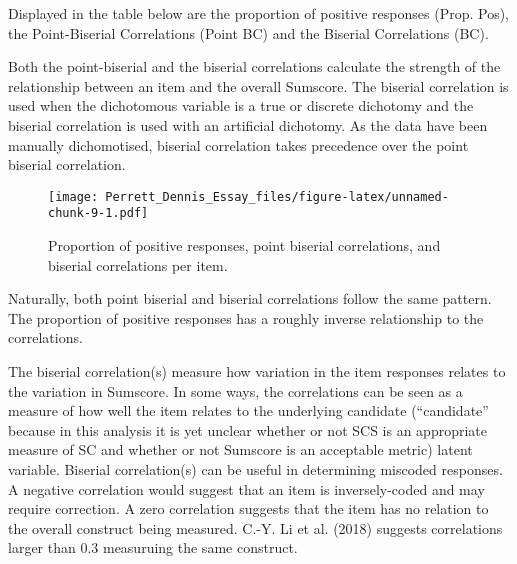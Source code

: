 \documentclass[
  man,floatsintext]{apa6}
\begin{document}
Displayed in the table below are the proportion of positive responses (Prop. Pos), the Point-Biserial Correlations (Point BC) and the Biserial Correlations (BC).

\begin{table}[H]
\centering
{}
\end{table}

Both the point-biserial and the biserial correlations calculate the strength of the relationship between an item and the overall Sumscore. The biserial correlation is used when the dichotomous variable is a true or discrete dichotomy and the biserial correlation is used with an artificial dichotomy. As the data have been manually dichomotised, biserial correlation takes precedence over the point biserial correlation.

\begin{figure}
\centering
\texttt{[image: Perrett\_Dennis\_Essay\_files/figure-latex/unnamed-chunk-9-1.pdf]}
\caption{\label{fig:unnamed-chunk-9}Proportion of positive responses, point biserial correlations, and biserial correlations per item.}
\end{figure}

Naturally, both point biserial and biserial correlations follow the same pattern. The proportion of positive responses has a roughly inverse relationship to the correlations.

The biserial correlation(s) measure how variation in the item responses relates to the variation in Sumscore. In some ways, the correlations can be seen as a measure of how well the item relates to the underlying candidate (``candidate'' because in this analysis it is yet unclear whether or not SCS is an appropriate measure of SC and whether or not Sumscore is an acceptable metric) latent variable. Biserial correlation(s) can be useful in determining miscoded responses. A negative correlation would suggest that an item is inversely-coded and may require correction. A zero correlation suggests that the item has no relation to the overall construct being measured. C.-Y. Li et al. (2018) suggests correlations larger than 0.3 measuruing the same construct.
\end{document}
